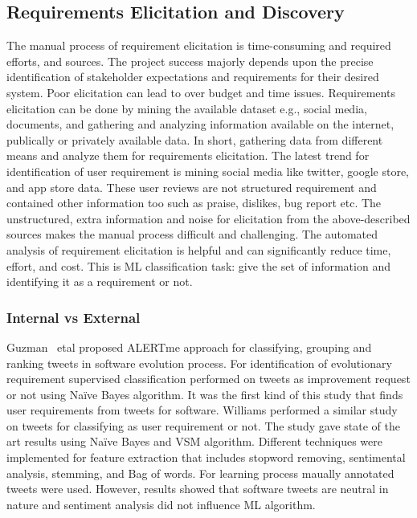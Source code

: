 
\subsection{Requirements Elicitation and Discovery} The manual process of requirement elicitation is time-consuming and required efforts, and sources. The project
success majorly depends upon the precise identification of stakeholder expectations and requirements for their desired system. Poor elicitation can lead to over budget and time issues. Requirements elicitation can be done by mining the available dataset e.g., social media, documents, and gathering and analyzing information available on the internet, publically or privately available data. In short, gathering data from different means and analyze them for requirements elicitation.  The latest trend for identification of user requirement is mining social media like twitter, google store, and app store data. These user reviews are not structured requirement and contained other information too such as praise, dislikes, bug report etc.  The unstructured, extra information and noise for elicitation from the above-described sources makes the manual process difficult and challenging. The automated analysis of requirement elicitation is helpful and can significantly reduce time, effort, and cost. This is ML classification task: give the set of information and
identifying it as a requirement or not.
\\

\subsubsection{Internal vs External}
Guzman ~etal \cite{Guzman:2017} proposed ALERTme approach for classifying,
grouping and ranking tweets in software evolution process. For identification of
evolutionary requirement supervised classification performed on tweets as
improvement request or not using Naïve Bayes algorithm. It was the first kind of
this study that finds user requirements from tweets for software. Williams \etal
{} \cite{Williams:2017} performed a similar study on
tweets for classifying as user requirement or not. The study gave state of the art results using Naïve Bayes
and VSM algorithm. Different techniques were implemented for feature extraction
that includes stopword removing, sentimental analysis, stemming, and Bag of words. For learning process maually annotated tweets were used. However, results showed that
software tweets are neutral in nature and sentiment analysis did not influence ML algorithm.\\

